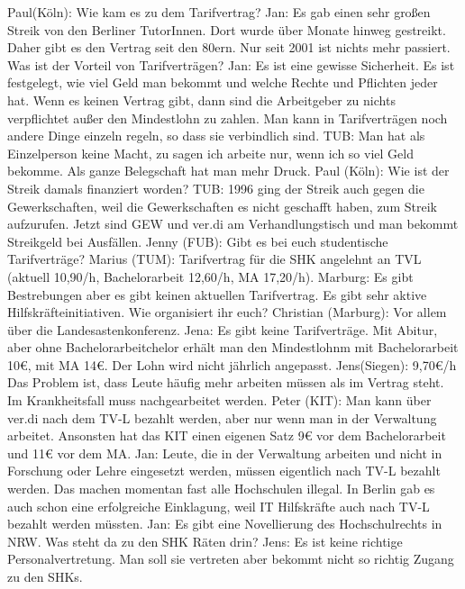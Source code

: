 \begin{outline}
      \1 Paul(Köln): Wie kam es zu dem Tarifvertrag?
          \2 Jan: Es gab einen sehr großen Streik von den Berliner TutorInnen. Dort wurde über Monate hinweg gestreikt. Daher gibt es den Vertrag seit den 80ern. Nur seit 2001 ist nichts mehr passiert.
      \1 Was ist der Vorteil von Tarifverträgen?
          \2 Jan: Es ist eine gewisse Sicherheit. Es ist festgelegt, wie viel Geld man bekommt und welche Rechte und Pflichten jeder hat. Wenn es keinen Vertrag gibt, dann sind die Arbeitgeber zu nichts verpflichtet außer den Mindestlohn zu zahlen. Man kann in Tarifverträgen noch andere Dinge einzeln regeln, so dass sie verbindlich sind.
          \2 TUB: Man hat als Einzelperson keine Macht, zu sagen ich arbeite nur, wenn ich so viel Geld bekomme. Als ganze Belegschaft hat man mehr Druck.
      \1 Paul (Köln): Wie ist der Streik damals finanziert worden?
          \2 TUB: 1996 ging der Streik auch gegen die Gewerkschaften, weil die Gewerkschaften es nicht geschafft haben, zum Streik aufzurufen. Jetzt sind GEW und ver.di am Verhandlungstisch und man bekommt Streikgeld bei Ausfällen.
      \1 Jenny (FUB): Gibt es bei euch studentische Tarifverträge?
          \2 Marius (TUM): Tarifvertrag für die SHK angelehnt an TVL (aktuell 10,90/h, Bachelorarbeit 12,60/h, MA 17,20/h).
          \2 Marburg: Es gibt Bestrebungen aber es gibt keinen aktuellen Tarifvertrag. Es gibt sehr aktive Hilfskräfteinitiativen.
      \1 Wie organisiert ihr euch?
          \2 Christian (Marburg): Vor allem über die Landesastenkonferenz.
          \2 Jena: Es gibt keine Tarifverträge. Mit Abitur, aber ohne Bachelorarbeitchelor erhält man den Mindestlohnm mit Bachelorarbeit 10€, mit MA 14€. Der Lohn wird nicht jährlich angepasst.
          \2 Jens(Siegen): 9,70€/h Das Problem ist, dass Leute häufig mehr arbeiten müssen als im Vertrag steht. Im Krankheitsfall muss nachgearbeitet werden.
          \2 Peter (KIT): Man kann über ver.di nach dem TV-L bezahlt werden, aber nur wenn man in der Verwaltung arbeitet. Ansonsten hat das KIT einen eigenen Satz 9€ vor dem Bachelorarbeit und 11€ vor dem MA.
          \2 Jan: Leute, die in der Verwaltung arbeiten und nicht in Forschung oder Lehre eingesetzt werden, müssen eigentlich nach TV-L bezahlt werden. Das machen momentan fast alle Hochschulen illegal. In Berlin gab es auch schon eine erfolgreiche Einklagung, weil IT Hilfskräfte auch nach TV-L bezahlt werden müssten.
      \1 Jan: Es gibt eine Novellierung des Hochschulrechts in NRW. Was steht da zu den SHK Räten drin?
          \2 Jens: Es ist keine richtige Personalvertretung. Man soll sie vertreten aber bekommt nicht so richtig Zugang zu den SHKs.

\end{outline}
